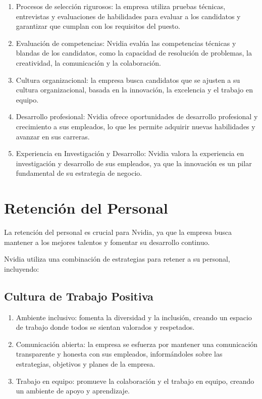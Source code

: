 \documentclass{article}
\begin{document}
\begin{enumerate}
  \item Procesos de selección rigurosos: la empresa utiliza pruebas técnicas, entrevistas y evaluaciones de habilidades para evaluar a los candidatos y garantizar que cumplan con los requisitos del puesto.
  \item Evaluación de competencias: Nvidia evalúa las competencias técnicas y blandas de los candidatos, como la capacidad de resolución de problemas, la creatividad, la comunicación y la colaboración.
  \item Cultura organizacional: la empresa busca candidatos que se ajusten a su cultura organizacional, basada en la innovación, la excelencia y el trabajo en equipo.
  \item Desarrollo profesional: Nvidia ofrece oportunidades de desarrollo profesional y crecimiento a sus empleados, lo que les permite adquirir nuevas habilidades y avanzar en sus carreras.
  \item Experiencia en Investigación y Desarrollo: Nvidia valora la experiencia en investigación y desarrollo de sus empleados, ya que la innovación es un pilar fundamental de su estrategia de negocio.
\end{enumerate}

\section{Retención del Personal}

La retención del personal es crucial para Nvidia, ya que la empresa busca mantener a los mejores talentos y fomentar su desarrollo continuo.

Nvidia utiliza una combinación de estrategias para retener a su personal, incluyendo:

\subsection{Cultura de Trabajo Positiva}

\begin{enumerate}
  \item Ambiente inclusivo: fomenta la diversidad y la inclusión, creando un espacio de trabajo donde todos se sientan valorados y respetados. 
  \item Comunicación abierta: la empresa se esfuerza por mantener una comunicación transparente y honesta con sus empleados, informándoles sobre las estrategias, objetivos y planes de la empresa. 
  \item Trabajo en equipo: promueve la colaboración y el trabajo en equipo, creando un ambiente de apoyo y aprendizaje. 
\end{enumerate}
\end{document}
